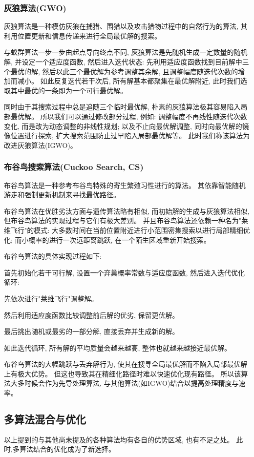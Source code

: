 \documentclass[oneside,UTF8]{ctexart}
\numberwithin{figure}{section} %
\begin{document}
\subsubsection{灰狼算法(GWO)}
灰狼算法是一种模仿灰狼在捕猎、围猎以及攻击猎物过程中的自然行为的算法,
其利用位置更新和信息传递来进行全局最优解的搜索\textsuperscript{\cite{ref9}}。

与蚁群算法一步一步由起点导向终点不同,
灰狼算法是先随机生成一定数量的随机解,
并设定一个适应度函数,
然后进入迭代状态:
先利用适应度函数找到目前解中三个最优的解,
然后以此三个最优解为参考调整其余解,
且调整幅度随迭代次数的增加而减小。
如此反复迭代若干次后,
所有解基本都聚集在最优解附近,
此时我们选取其中最优的一条即为一个可行最优解\textsuperscript{\cite{ref10}}。

同时由于其搜索过程中总是追随三个临时最优解,
朴素的灰狼算法极其容易陷入局部最优解。
所以我们可以通过修改部分过程,
例如:
调整幅度不再线性随迭代次数变化,
而是改为动态调整的非线性规划;
以及不止向最优解调整,
同时向最优解的镜像位置进行探索,
扩大搜索范围防止过早陷入局部最优解等。
此时我们称该算法为改进灰狼算法(IGWO)。
\subsubsection{布谷鸟搜索算法(Cuckoo Search, CS)}
布谷鸟算法是一种参考布谷鸟特殊的寄生繁殖习性进行的算法。
其依靠智能随机游走和强制更新机制来寻找最优路径。

布谷鸟算法在优胜劣汰方面与遗传算法略有相似,
而初始解的生成与灰狼算法相似,
但布谷鸟算法的实现过程与它们有极大差别。
并且布谷鸟算法还依赖一种名为"莱维飞行"的模式:
大多数时间在当前位置附近进行小范围密集搜索以进行局部精细优化;
而小概率的进行一次远距离跳跃,
在一个陌生区域重新开始搜索。

布谷鸟算法的具体实现过程如下:

首先初始化若干可行解,
设置一个弃巢概率常数与适应度函数,
然后进入迭代优化循环:

先依次进行"莱维飞行"调整解。

然后利用适应度函数比较调整前后解的优劣,
保留更优解。

最后挑出随机或最劣的一部分解,
直接丢弃并生成新的解。

如此迭代循环,
所有解的平均质量会越来越高,
整体也就越来越接近最优解。

布谷鸟算法的大幅跳跃与丢弃解行为,
使其在搜寻全局最优解而不陷入局部最优解上有极大优势。
但这也导致其在精细化路径时难以快速优化现有路径。
所以该算法大多时候会作为先导处理算法,
与其他算法(如IGWO)结合以提高处理精度与速率。
\subsection{多算法混合与优化}
以上提到的与其他尚未提及的各种算法均有各自的优势区域,
也有不足之处。
此时,多算法结合的优化成为了新选择。
\end{document}
